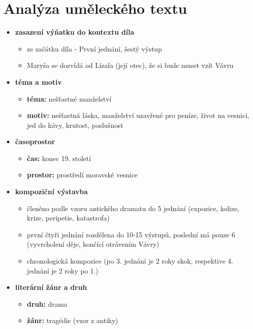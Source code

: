 \documentclass[11pt]{article}
\begin{document}
    \section*{Analýza uměleckého textu}
    \begin{itemize}
        \item\textbf{zasazení výňatku do kontextu díla}
        \begin{itemize}
            \item ze začátku díla - První jednání, šestý výstup
            \item Maryša se dozvídá od Lízala (její otec), že si bude muset vzít Vávru
        \end{itemize}
        \item\textbf{téma a motiv}
        \begin{itemize}
            \item\textbf{téma:} nešťastné manželství
            \item\textbf{motiv:} nešťastná láska, manželství uzavřené pro peníze, život na vesnici, jed do kávy, krutost, poslušnost
        \end{itemize}
        \item\textbf{časoprostor}
        \begin{itemize}
            \item\textbf{čas:} konec 19. století
            \item\textbf{prostor:} prostředí moravské vesnice
        \end{itemize}
        \item\textbf{kompoziční výstavba}
        \begin{itemize}
            \item členěno podle vzoru antického dramatu do 5 jednání (expozice, kolize, krize, peripetie, katastrofa)
            \item první čtyři jednání rozdělena do 10-15 výstupů, poslední má pouze 6 (vyvrcholení děje, končící otrávením Vávry)
            \item chronologická kompozice (po 3. jednání je 2 roky skok, respektive 4. jednání je 2 roky po 1.)
        \end{itemize}
        \item\textbf{literární žánr a druh}
        \begin{itemize}
            \item\textbf{druh:} drama
            \item\textbf{žánr:} tragédie (vzor z antiky)
        \end{itemize}

\end{itemize}
\end{document}
